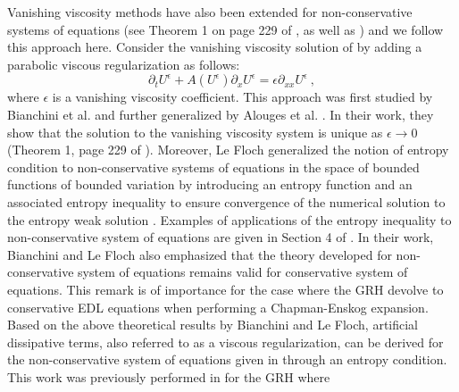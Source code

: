 \documentclass[times,doublespace]{fldauth}%
\begin{document}
%
Vanishing viscosity methods have also been extended for non-conservative systems of equations (see Theorem 1 on page 229 of \cite{bianchini_bressan_2005}, as well as \cite{lefloch_1988,alouges_merlet_2004}) 
and we follow this approach here.
Consider the  vanishing viscosity solution of  by adding a parabolic viscous regularization as follows:
%
\begin{equation}
\label{eq:nc-syst-eq-visc}
\partial_t U^\epsilon + A(U^\epsilon) \partial_x U^\epsilon = \epsilon \partial_{xx} U^\epsilon \ , \nonumber
\end{equation}
%
where $\epsilon$ is a vanishing viscosity coefficient. This approach was first studied by Bianchini et al. \cite{bianchini_bressan_2005} and 
further generalized by Alouges et al. \cite{alouges_merlet_2004}. In their work, they show that the solution to the 
vanishing viscosity system is unique as $\epsilon \to 0$ (Theorem 1, page 229 of \cite{bianchini_bressan_2005}). 
%
Moreover, Le Floch generalized the notion of entropy 
condition to non-conservative systems of equations in the space of bounded functions of bounded variation by introducing an entropy function 
and an associated entropy inequality to ensure convergence of the numerical solution to the entropy weak solution \cite{lefloch_1988}. Examples of applications of the
entropy inequality to non-conservative system of equations are given in Section 4 of \cite{lefloch_1988}. In their work, Bianchini and Le Floch also emphasized that the theory developed for non-conservative system of equations remains valid for conservative system of equations. This remark is of importance for the case where the GRH devolve to conservative EDL equations when performing a Chapman-Enskog expansion. Based on the above theoretical results by Bianchini and Le Floch, artificial dissipative terms, also referred to as a viscous regularization, can be derived for the non-conservative system of equations given in  through an entropy condition. This work was previously performed in \cite{our_jcp_radhy_paper} for the GRH where 
\end{document}
